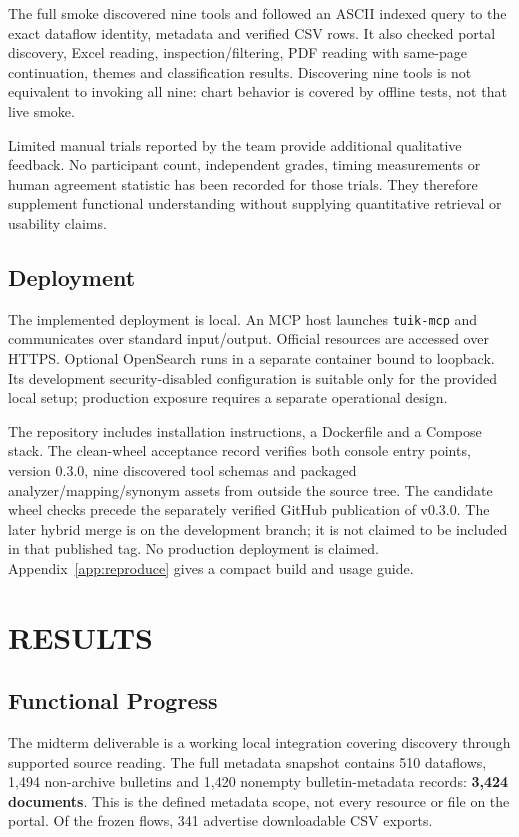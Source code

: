 \documentclass[a4paper,12pt]{report}
\newcommand{\code}[1]{\texttt{\small #1}}
\begin{document}
The full smoke discovered nine tools and followed an ASCII indexed query to the exact dataflow identity, metadata and verified CSV rows. It also checked portal discovery, Excel reading, inspection/filtering, PDF reading with same-page continuation, themes and classification results. Discovering nine tools is not equivalent to invoking all nine: chart behavior is covered by offline tests, not that live smoke.

Limited manual trials reported by the team provide additional qualitative feedback. No participant count, independent grades, timing measurements or human agreement statistic has been recorded for those trials. They therefore supplement functional understanding without supplying quantitative retrieval or usability claims.

\section{Deployment}
The implemented deployment is local. An MCP host launches \code{tuik-mcp} and communicates over standard input/output. Official resources are accessed over HTTPS. Optional OpenSearch runs in a separate container bound to loopback. Its development security-disabled configuration is suitable only for the provided local setup; production exposure requires a separate operational design.

The repository includes installation instructions, a Dockerfile and a Compose stack. The clean-wheel acceptance record verifies both console entry points, version 0.3.0, nine discovered tool schemas and packaged analyzer/mapping/synonym assets from outside the source tree. The candidate wheel checks precede the separately verified GitHub publication of v0.3.0. The later hybrid merge is on the development branch; it is not claimed to be included in that published tag. No production deployment is claimed. Appendix~\ref{app:reproduce} gives a compact build and usage guide.

\chapter{RESULTS}
\section{Functional Progress}
The midterm deliverable is a working local integration covering discovery through supported source reading. The full metadata snapshot contains 510 dataflows, 1,494 non-archive bulletins and 1,420 nonempty bulletin-metadata records: \textbf{3,424 documents}. This is the defined metadata scope, not every resource or file on the portal. Of the frozen flows, 341 advertise downloadable CSV exports.
\end{document}
